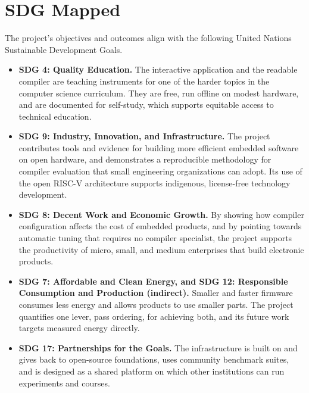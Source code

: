 \section{SDG Mapped}

The project's objectives and outcomes align with the following United Nations Sustainable Development Goals.

\begin{itemize}
  \item \textbf{SDG 4: Quality Education.} The interactive application and the readable compiler are teaching instruments for one of the harder topics in the computer science curriculum. They are free, run offline on modest hardware, and are documented for self-study, which supports equitable access to technical education.
  \item \textbf{SDG 9: Industry, Innovation, and Infrastructure.} The project contributes tools and evidence for building more efficient embedded software on open hardware, and demonstrates a reproducible methodology for compiler evaluation that small engineering organizations can adopt. Its use of the open RISC-V architecture supports indigenous, license-free technology development.
  \item \textbf{SDG 8: Decent Work and Economic Growth.} By showing how compiler configuration affects the cost of embedded products, and by pointing towards automatic tuning that requires no compiler specialist, the project supports the productivity of micro, small, and medium enterprises that build electronic products.
  \item \textbf{SDG 7: Affordable and Clean Energy, and SDG 12: Responsible Consumption and Production (indirect).} Smaller and faster firmware consumes less energy and allows products to use smaller parts. The project quantifies one lever, pass ordering, for achieving both, and its future work targets measured energy directly.
  \item \textbf{SDG 17: Partnerships for the Goals.} The infrastructure is built on and gives back to open-source foundations, uses community benchmark suites, and is designed as a shared platform on which other institutions can run experiments and courses.
\end{itemize}
